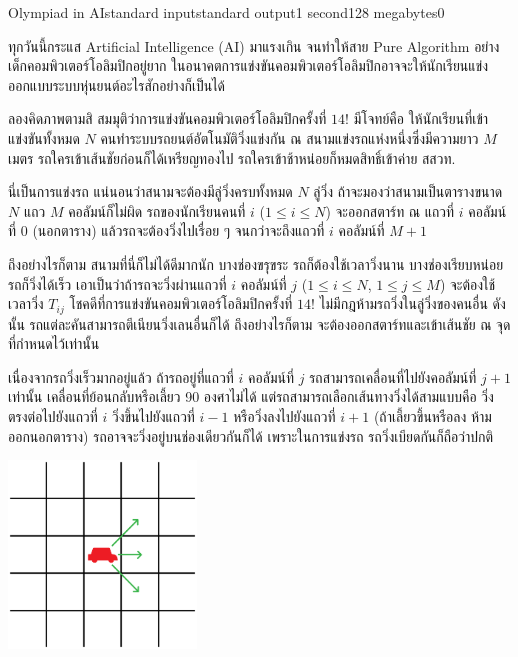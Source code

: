 \documentclass[11pt,a4paper]{article}
\begin{document}
\begin{problem}{Olympiad in AI}{standard input}{standard output}{1 second}{128 megabytes}{0}

ทุกวันนี้กระแส Artificial Intelligence (AI) มาแรงเกิน จนทำให้สาย Pure Algorithm อย่างเด็กคอมพิวเตอร์โอลิมปิกอยู่ยาก ในอนาคตการแข่งขันคอมพิวเตอร์โอลิมปิกอาจจะให้นักเรียนแข่งออกแบบระบบหุ่นยนต์อะไรสักอย่างก็เป็นได้

ลองคิดภาพตามสิ สมมุติว่าการแข่งขันคอมพิวเตอร์โอลิมปิกครั้งที่ $14!$ มีโจทย์คือ ให้นักเรียนที่เข้าแข่งขันทั้งหมด $N$ คนทำระบบรถยนต์อัตโนมัติวิ่งแข่งกัน ณ สนามแข่งรถแห่งหนึ่งซึ่งมีความยาว $M$ เมตร รถใครเข้าเส้นชัยก่อนก็ได้เหรียญทองไป รถใครเข้าช้าหน่อยก็หมดสิทธิ์เข้าค่าย สสวท.

นี่เป็นการแข่งรถ แน่นอนว่าสนามจะต้องมีลู่วิ่งครบทั้งหมด $N$ ลู่วิ่ง ถ้าจะมองว่าสนามเป็นตารางขนาด $N$ แถว $M$ คอลัมน์ก็ไม่ผิด รถของนักเรียนคนที่ $i$ ($1 \leq i \leq N$) จะออกสตาร์ท ณ แถวที่ $i$ คอลัมน์ที่ $0$ (นอกตาราง) แล้วรถจะต้องวิ่งไปเรื่อย ๆ จนกว่าจะถึงแถวที่ $i$ คอลัมน์ที่ $M+1$

ถึงอย่างไรก็ตาม สนามที่นี่ก็ไม่ได้ดีมากนัก บางช่องขรุขระ รถก็ต้องใช้เวลาวิ่งนาน บางช่องเรียบหน่อยรถก็วิ่งได้เร็ว เอาเป็นว่าถ้ารถจะวิ่งผ่านแถวที่ $i$ คอลัมน์ที่ $j$ ($1 \leq i \leq N$, $1 \leq j \leq M$) จะต้องใช้เวลาวิ่ง $T_{ij}$ โชคดีที่การแข่งขันคอมพิวเตอร์โอลิมปิกครั้งที่ $14!$ ไม่มีกฎห้ามรถวิ่งในลู่วิ่งของคนอื่น ดังนั้น รถแต่ละคันสามารถตีเนียนวิ่งเลนอื่นก็ได้ ถึงอย่างไรก็ตาม จะต้องออกสตาร์ทและเข้าเส้นชัย ณ จุดที่กำหนดไว้เท่านั้น

เนื่องจากรถวิ่งเร็วมากอยู่แล้ว ถ้ารถอยู่ที่แถวที่ $i$ คอลัมน์ที่ $j$ รถสามารถเคลื่อนที่ไปยังคอลัมน์ที่ $j+1$ เท่านั้น เคลื่อนที่ย้อนกลับหรือเลี้ยว 90 องศาไม่ได้ แต่รถสามารถเลือกเส้นทางวิ่งได้สามแบบคือ วิ่งตรงต่อไปยังแถวที่ $i$ วิ่งขึ้นไปยังแถวที่ $i-1$ หรือวิ่งลงไปยังแถวที่ $i+1$ (ถ้าเลี้ยวขึ้นหรือลง ห้ามออกนอกตาราง) รถอาจจะวิ่งอยู่บนช่องเดียวกันก็ได้ เพราะในการแข่งรถ รถวิ่งเบียดกันก็ถือว่าปกติ

\begin{center}
\includegraphics[width=5cm]{car.png}
\end{center}


\end{problem}
\end{document}
